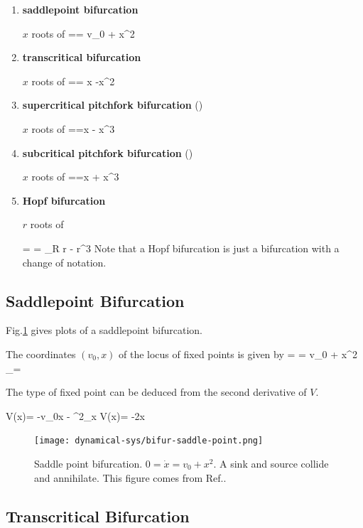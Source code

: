 \begin{enumerate}
\item {\bf saddlepoint bifurcation}

$x$ roots of
== v_0 + x^2
\eeq

\item{\bf transcritical bifurcation}

$x$ roots of
== \lam x -x^2
\eeq
\item {\bf supercritical pitchfork bifurcation} (\supercri)

$x$  roots of
==\lam x - x^3
\eeq
\item {\bf subcritical pitchfork bifurcation} (\subcri)

$x$ roots of 
==\lam x + x^3
\eeq

\item {\bf Hopf bifurcation}

$r$ roots of

= = \mu_R r - r^3
\eeq
Note that a Hopf bifurcation is just a \supercri bifurcation with a change of notation.

\end{enumerate}




\subsection{Saddlepoint Bifurcation}

Fig.\ref{fig-bifur-saddle-point} gives plots of a saddlepoint
bifurcation.

The coordinates $(v_0, x)$ of the locus 
of fixed points is given by
=  = v_0 + x^2 \implies
 _{\pm}=\pm {}
 \eeq
 
 The type of
 fixed point can be 
 deduced from the second derivative
 of $V$.
 
 \beq
 V(x)= -v_0x -
 \implies
 \partial^2_x V(x)= -2x
 \eeq
 
 \begin{figure}[h!]
 \centering
 \texttt{[image: dynamical-sys/bifur-saddle-point.png]}
 \caption{Saddle point bifurcation. $0= \dot{x} = v_0 + x^2$. 
 A sink and source collide and annihilate.
 This
 figure  comes from Ref.\cite{dynamical-fuchs}.}
 \label{fig-bifur-saddle-point}
 \end{figure}
 
\subsection{Transcritical Bifurcation}


